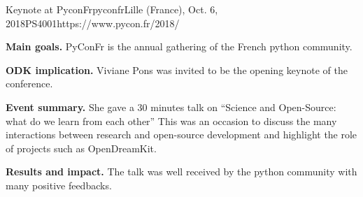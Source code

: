 \begin{event}{Keynote at PyconFr}{pyconfr}{Lille (France), Oct. 6, 2018}{PS}{400}{1}{https://www.pycon.fr/2018/}

\textbf{Main goals.} PyConFr is the annual gathering of the French python community. 

\textbf{ODK implication.} Viviane Pons was invited to be the opening keynote of the conference.

\textbf{Event summary.} She gave a 30 minutes talk on ``Science and Open-Source: what do we learn from each other'' This was an occasion to discuss the many interactions between research and open-source development and highlight the role of projects such as OpenDreamKit.

\textbf{Results and impact.} The talk was well received by the python community with many positive feedbacks.

\end{event}